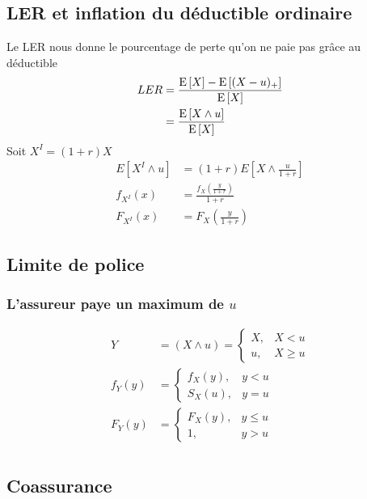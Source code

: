 \documentclass[french, landscape]{article}
\begin{document}
\begin{multicols*}{3}
\subsection*{LER et inflation du déductible ordinaire}
Le LER nous donne le pourcentage de perte qu'on ne paie pas grâce au déductible
\begin{align*}
	LER 	 &= \frac{\mathrm{E} \left[ X \right] - \mathrm{E} \left[ (X-u)_+ \right]}{\mathrm{E} \left[ X \right]} \\
	     &= \frac{\mathrm{E} \left[ X \wedge u \right]}{\mathrm{E} \left[ X \right]} \\
\end{align*}
Soit $X^I = (1 + r) X$
\begin{align*}
	E[{X^I} \wedge u]	 &= (1 + r) E[X \wedge \frac{u}{1 + r}] \\
	f_{X^I}(x) &= \frac{f_X\left(\frac{y}{1 + r}\right)}{1 + r} \\
	F_{X^I}(x) &= F_X\left(\frac{y}{1 + r}\right)
\end{align*}

\subsection*{Limite de police}
\subsubsection*{L'assureur paye un maximum de $u$}

\begin{align*}
Y 	&= (X \wedge u)
	= 
	\left\{
		\begin{array}{ll}
			X, & X < u \\
			u, & X \geq u
		\end{array}
	\right. \\
f_Y(y) &=
		\left\{
			\begin{array}{ll}
				f_X(y), & y < u \\
				S_X(u), & y = u
			\end{array}
		\right. \\
F_Y(y) &=
		\left\{
			\begin{array}{ll}
				F_X(y), & y \leq u \\
				1, & y > u
			\end{array}
		\right. \\
\end{align*}

\subsection*{Coassurance}

\end{multicols*}
\end{document}
